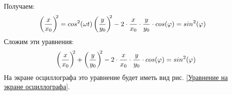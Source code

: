 \documentclass[a4paper, usenames, dvipsnames]{article}
\begin{document}
Получаем:
\begin{eqnarray*}
    \left(\dfrac{x}{x_0}\right)^{\hspace{-0.3em}2} = cos^2(\omega t) & \left(\dfrac{y}{y_0}\right)^{\hspace{-0.3em}2} - 2 \cdot \dfrac{x}{x_0} \cdot \dfrac{y}{y_0} \cdot cos(\varphi) = sin^2(\varphi)
\end{eqnarray*}
Сложим эти уравнения:
\begin{gather*}
    \left(\dfrac{x}{x_0}\right)^{\hspace{-0.3em}2} + \left(\dfrac{y}{y_0}\right)^{\hspace{-0.3em}2} - 2 \cdot \dfrac{x}{x_0} \cdot \dfrac{y}{y_0} \cdot cos(\varphi) = sin^2(\varphi)
\end{gather*}
На экране осциллографа это уравнение будет иметь вид рис. \ref{Уравнение на экране осциллографа}.
\end{document}
